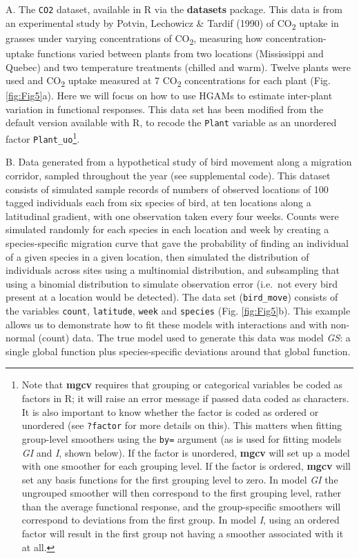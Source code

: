 \documentclass[12pt]{article}
\let\rmarkdownfootnote\footnote%
\def\footnote{\protect\rmarkdownfootnote}
\begin{document}
A. The \texttt{CO2} dataset, available in R via the \textbf{datasets}
package. This data is from an experimental study by Potvin, Lechowicz \&
Tardif (1990) of CO\textsubscript{2} uptake in grasses under varying
concentrations of CO\textsubscript{2}, measuring how
concentration-uptake functions varied between plants from two locations
(Mississippi and Quebec) and two temperature treatments (chilled and
warm). Twelve plants were used and CO\textsubscript{2} uptake measured
at 7 CO\textsubscript{2} concentrations for each plant (Fig.
\ref{fig:Fig5}a). Here we will focus on how to use HGAMs to estimate
inter-plant variation in functional responses. This data set has been
modified from the default version available with R, to recode the
\texttt{Plant} variable as an unordered factor
\texttt{Plant\_uo}\footnote{Note that \textbf{mgcv} requires that
  grouping or categorical variables be coded as factors in R; it will
  raise an error message if passed data coded as characters. It is also
  important to know whether the factor is coded as ordered or unordered
  (see \texttt{?factor} for more details on this). This matters when
  fitting group-level smoothers using the \texttt{by=} argument (as is
  used for fitting models \emph{GI} and \emph{I}, shown below). If the
  factor is unordered, \textbf{mgcv} will set up a model with one
  smoother for each grouping level. If the factor is ordered,
  \textbf{mgcv} will set any basis functions for the first grouping
  level to zero. In model \emph{GI} the ungrouped smoother will then
  correspond to the first grouping level, rather than the average
  functional response, and the group-specific smoothers will correspond
  to deviations from the first group. In model \emph{I}, using an
  ordered factor will result in the first group not having a smoother
  associated with it at all.}.

B. Data generated from a hypothetical study of bird movement along a
migration corridor, sampled throughout the year (see supplemental code).
This dataset consists of simulated sample records of numbers of observed
locations of 100 tagged individuals each from six species of bird, at
ten locations along a latitudinal gradient, with one observation taken
every four weeks. Counts were simulated randomly for each species in
each location and week by creating a species-specific migration curve
that gave the probability of finding an individual of a given species in
a given location, then simulated the distribution of individuals across
sites using a multinomial distribution, and subsampling that using a
binomial distribution to simulate observation error (i.e.~not every bird
present at a location would be detected). The data set
(\texttt{bird\_move}) consists of the variables \texttt{count},
\texttt{latitude}, \texttt{week} and \texttt{species} (Fig.
\ref{fig:Fig5}b). This example allows us to demonstrate how to fit these
models with interactions and with non-normal (count) data. The true
model used to generate this data was model \emph{GS}: a single global
function plus species-specific deviations around that global function.
\end{document}
